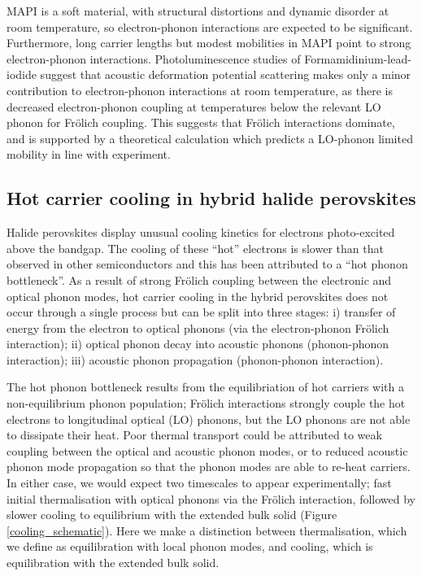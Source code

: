 MAPI is a soft material, with structural distortions and dynamic disorder at room temperature, so electron-phonon interactions are expected to be significant.
Furthermore, long carrier lengths but modest mobilities in MAPI point to strong electron-phonon interactions.\autocite{Brenner2015} 
Photoluminescence studies of Formamidinium-lead-iodide suggest that acoustic deformation potential scattering makes only a minor contribution to electron-phonon interactions at room temperature,\autocite{Wright2016}
as there is decreased electron-phonon coupling at temperatures below the relevant LO phonon for Fr\"{o}lich coupling. This suggests that Fr\"{o}lich interactions dominate, and is supported by a theoretical calculation which predicts a LO-phonon limited mobility in line with experiment.\autocite{Frost2017b}

\subsection{Hot carrier cooling in hybrid halide perovskites}

Halide perovskites display unusual cooling kinetics for electrons photo-excited above the bandgap.
The cooling of these ``hot'' electrons is slower than that observed in other semiconductors and this has been attributed to a ``hot phonon bottleneck''.\autocite{Yang2016e,Yang2017a} %
As a result of strong Fr\"{o}lich coupling between the electronic and optical phonon modes, hot carrier cooling in the hybrid perovskites does not occur through a single process but can be split into three stages: i) transfer of energy from the electron to optical phonons (via the electron-phonon Fr\"{o}lich interaction); ii) optical phonon decay into acoustic phonons (phonon-phonon interaction); iii) acoustic phonon propagation (phonon-phonon interaction).

The hot phonon bottleneck results from the equilibriation of hot carriers with a non-equilibrium phonon population;
Fr\"{o}lich interactions strongly couple the hot electrons to longitudinal optical (LO) phonons, but the LO phonons are not able to dissipate their heat. 
Poor thermal transport could be attributed to weak coupling between the optical and acoustic phonon modes, or to reduced acoustic phonon mode propagation so that the phonon modes are able to re-heat carriers.
In either case, we would expect two timescales to appear experimentally; fast initial thermalisation with optical phonons via the Fr\"{o}lich interaction, followed by slower cooling to equilibrium with the extended bulk solid (Figure \ref{cooling_schematic}). Here we make a distinction between thermalisation, which we define as equilibration with local phonon modes, and cooling, which is equilibration with the extended bulk solid.

